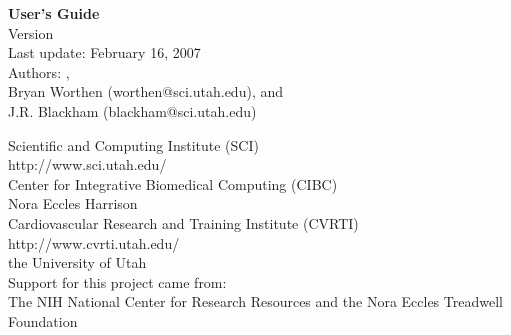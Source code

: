   \mbox{}
  \vspace{2in}
\begin{center}
   {\huge\bf \map{} User's Guide}\\
   \vspace{.5in}
   {\Large Version \version{}\\
   \medskip
   Last update: February 16, 2007 \\}
   \bigskip
   {\Large Authors: \rob{}, \\
   Bryan Worthen (worthen@sci.utah.edu), and \\
   J.R. Blackham (blackham@sci.utah.edu)}
   \bigskip

   {\Large 
   \medskip
   Scientific and Computing Institute (SCI)\\
   {http://www.sci.utah.edu/}\\
   \medskip
   Center for Integrative Biomedical Computing (CIBC)
   \\
   \medskip
   Nora Eccles Harrison \\
   Cardiovascular Research and Training Institute (CVRTI)\\
   {http://www.cvrti.utah.edu/}\\
   \medskip
   the University of Utah}\\

   \bigskip
   Support for this project came from:\\
   \medskip
   {\Large The NIH National Center for Research Resources  
    and the Nora
   Eccles Treadwell Foundation\\ 
   \smallskip
   }

\end{center}

